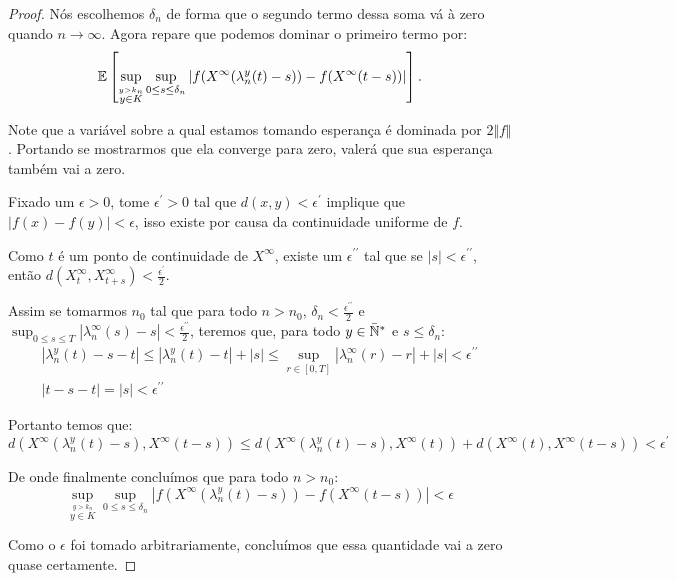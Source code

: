 \begin{proof}
  Nós escolhemos $\delta_n$ de forma que o segundo termo dessa soma vá
  à zero quando $n \to \infty$. Agora repare que podemos dominar o
  primeiro termo por:
  \begin{displaymath}
     {\mathbb{E}} \left[ \sup_{\stackrel{y > k_n}{y\in K}}
      \sup_{0 \leq s \leq \delta_n} \left\lvert
        f(X^\infty(\lambda_n^y(t)-s)) -
        f(X^\infty(t-s))
    \right\rvert \right].
  \end{displaymath}

  Note que a variável sobre a qual estamos tomando esperança é
  dominada por $2\Vert f \Vert$. Portando se mostrarmos que ela
  converge \qc para zero, valerá que sua esperança também vai a zero.

  Fixado um $\epsilon > 0$, tome $\epsilon^\prime > 0$ tal que $d(x, y) <
  \epsilon^\prime$ implique que $|f(x) - f(y)| < \epsilon$, isso
  existe por causa da continuidade uniforme de $f$.
 
  Como $t$ é \qc um ponto de continuidade de $X^\infty$, existe um
  $\epsilon^{\prime\prime}$ tal que se $|s| <
  \epsilon^{\prime\prime}$, então $d(X^\infty_t, X^\infty_{t+s}) <
  \frac{\epsilon^{\prime}}{2}$.

  Assim se tomarmos $n_0$ tal que para todo $n > n_0$, $\delta_{n} <
  \frac{\epsilon^{\prime\prime}}{2}$ e $\sup_{0 \leq s \leq T}
  |\lambda_n^\infty(s) - s| < \frac{\epsilon^{\prime\prime}}{2}$, teremos
  que, para todo $y\in{\mathbb{\bar{N}^*}}$ e $s \leq \delta_n$:
  \begin{gather*}
    |\lambda_n^y(t) - s - t| \leq 
     |\lambda_n^y(t) - t | + |s| \leq
     \sup_{r \in [0, T]} |\lambda_n^\infty(r) - r | + |s|
     < \epsilon^{\prime\prime}\\
    |t - s - t |  = |s| < \epsilon^{\prime\prime}
  \end{gather*}
  
  Portanto temos que:
  \begin{displaymath}
    d(X^\infty(\lambda_n^y(t)-s), X^\infty(t-s)) \leq
     d(X^\infty(\lambda_n^y(t)-s), X^\infty(t))+
     d(X^\infty(t), X^\infty(t-s))
     < \epsilon^{\prime}
  \end{displaymath}

  De onde finalmente concluímos que para todo $n > n_0$:
  \begin{displaymath} 
    \sup_{\stackrel{y > k_n}{y \in K}}
    \sup_{0 \leq s \leq \delta_n} \left\lvert
      f(X^\infty(\lambda_n^y(t)-s)) -
      f(X^\infty(t-s))
    \right\rvert < \epsilon
  \end{displaymath}

  Como o $\epsilon$ foi tomado arbitrariamente, concluímos que essa
  quantidade vai a zero quase certamente.
\end{proof}

